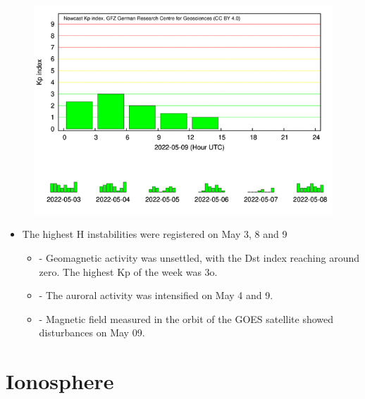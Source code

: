 \documentclass[11pt, oneside]{article}
\begin{document}
                     \begin{figure}[H]
    
                        \centering
   
                             \includegraphics[width=14cm]{./figures//figureGeomag_6.png}

                        \end{figure}

                     \begin{itemize} 
\begin{itemize} 
 \item - Data from the Embrace magnetometer network showed instabilities throughout the period, with some events highlighted:
 \end{itemize} 
\item The highest H instabilities were registered on May 3, 8 and 9
\begin{itemize} 
 \item - Geomagnetic activity was unsettled, with the Dst index reaching around zero. The highest Kp of the week was 3o.
 \end{itemize} 
\begin{itemize} 
 \item - The auroral activity was intensified on May 4 and 9.
 \end{itemize} 
\begin{itemize} 
 \item - Magnetic field measured in the orbit of the GOES satellite showed disturbances on May 09.
 \end{itemize} 
\end{itemize} 
\section{Ionosphere} 
\end{document}
